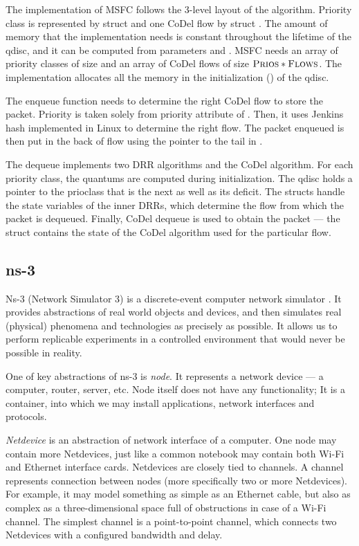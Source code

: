 The implementation of MSFC follows the 3-level layout of the algorithm. Priority class is represented by struct  and one CoDel flow by struct . The amount of memory that the implementation needs is constant throughout the lifetime of the qdisc, and it can be computed from parameters  and . MSFC needs an array of priority classes of size  and an array of CoDel flows of size $\textsc{Prios} * \textsc{Flows}$. The implementation allocates all the memory in the initialization () of the qdisc.

The enqueue function needs to determine the right CoDel flow to store the packet. Priority is taken solely from priority attribute of . Then, it uses Jenkins hash implemented in Linux to determine the right flow. The packet enqueued is then put in the back of flow using the pointer to the tail in . 

The dequeue implements two DRR algorithms and the CoDel algorithm. For each priority class, the quantums are computed during initialization. The qdisc holds a pointer to the prioclass that is the next as well as its deficit. The  structs handle the state variables of the inner DRRs, which determine the flow from which the packet is dequeued. Finally, CoDel dequeue is used to obtain the packet --- the  struct contains the state of the CoDel algorithm used for the particular flow.

\subsection {ns-3}

Ns-3 (Network Simulator 3) is a discrete-event computer network simulator \cite{ns3}. It provides abstractions of real world objects and devices, and then simulates real (physical) phenomena and technologies as precisely as possible.  It allows us to perform replicable  experiments in a controlled environment that would never be possible in reality.


One of key abstractions of ns-3 is \emph{node}. It represents a network device --- a computer, router, server, etc. Node itself does not have any functionality; It is a container, into which we may install applications, network interfaces and protocols.

\emph{Netdevice} is an abstraction of network interface of a computer. One node may contain more Netdevices, just like a common notebook may contain both Wi-Fi and Ethernet interface cards. Netdevices are closely tied to channels. A channel represents connection between nodes (more specifically two or more Netdevices). For example, it may model something as simple as an Ethernet cable, but also as complex as a three-dimensional space full of obstructions in case of a Wi-Fi channel. The simplest channel is a point-to-point channel, which connects two Netdevices with a configured bandwidth and delay.

